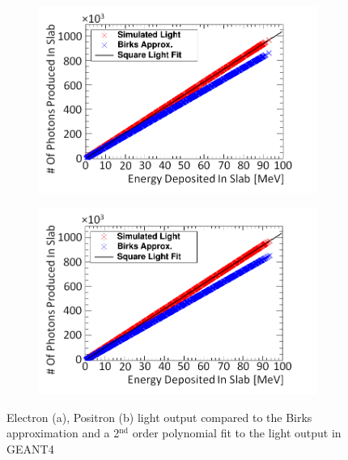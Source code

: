 \begin{figure}[!h]
\centering
\begin{subfigure}{.5\textwidth}
  \centering
  \includegraphics[width=\linewidth]{Chapter4/Figs/Raster/electronSimulatedLightNew.png}
  \captionsetup{width=.9\linewidth}
  \caption{}
  \label{subFig:electron_light}
\end{subfigure}%
\begin{subfigure}{.5\textwidth}
  \centering
  \includegraphics[width=\linewidth]{Chapter4/Figs/Raster/positronSimulatedLightNew.png}
  \captionsetup{width=.9\linewidth}
  \caption{}
  \label{subFig:positron_light}
\end{subfigure}
\caption[Electron and positron light output in GEANT4.]{Electron (a), Positron (b) light output compared to the Birks approximation and a 2$^\textrm{nd}$ order polynomial fit to the light output in GEANT4}
\label{fig:electron_positron_light}
\end{figure}

